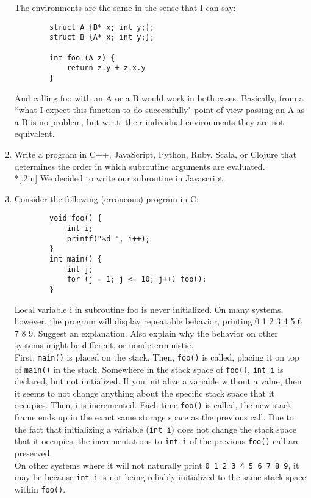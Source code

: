 \documentclass{article}
\begin{document}
\begin{enumerate}
    The environments are the same in the sense that I can say:\\
    \begin{verbatim}
        struct A {B* x; int y;};
        struct B {A* x; int y;};

        int foo (A z) {
            return z.y + z.x.y
        }
    \end{verbatim}
    And calling foo with an A or a B would work in both cases. Basically, from a ``what I expect this function to do successfully" point of view passing an A as a B is no problem, but w.r.t. their individual environments they are not equivalent.
    \pagebreak
    \item Write a program in C++, JavaScript, Python, Ruby, Scala, or Clojure that determines the order in which subroutine arguments are evaluated.\\*[.2in]
    We decided to write our subroutine in Javascript.
    
    \pagebreak
    \item Consider the following (erroneous) program in C:
    \begin{verbatim}
        void foo() {
            int i;
            printf("%d ", i++);
        }
        int main() {
            int j;
            for (j = 1; j <= 10; j++) foo();
        }
    \end{verbatim}
    Local variable i in subroutine foo is never initialized. On many systems, however, the program will display repeatable behavior, printing 0 1 2 3 4 5 6 7 8 9. Suggest an explanation. Also explain why the behavior on other systems might be different, or nondeterministic. \\[.3in]

    First, \texttt{main()} is placed on the stack. Then, \texttt{foo()} is called, placing it on top of \texttt{main()} in the stack. Somewhere in the stack space of \texttt{foo()}, \texttt{int i} is declared, but not initialized. If you initialize a variable without a value, then it seems to not change anything about the specific stack space that it occupies. Then, i is incremented. Each time \texttt{foo()} is called, the new stack frame ends up in the exact same storage space as the previous call. Due to the fact that initializing a variable (\texttt{int i}) does not change the stack space that it occupies, the incrementations to \texttt{int i} of the previous \texttt{foo()} call are preserved. \\

    On other systems where it will not naturally print \texttt{0 1 2 3 4 5 6 7 8 9}, it may be because \texttt{int i} is not being reliably initialized to the same stack space within \texttt{foo()}.
    

\end{enumerate}
\end{document}
